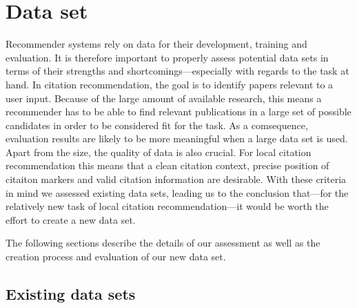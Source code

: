 \chapter{Data set}\label{chap:dataset}
Recommender systems rely on data for their development, training and evaluation. It is therefore important to properly assess potential data sets in terms of their strengths and shortcomings---especially with regards to the task at hand. In citation recommendation, the goal is to identify papers relevant to a user input. Because of the large amount of available research, this means a recommender has to be able to find relevant publications in a large set of possible candidates in order to be considered fit for the task. As a comsequence, evaluation results are likely to be more meaningful when a large data set is used. Apart from the size, the quality of data is also crucial. For local citation recommendation this means that a clean citation context, precise position of citaiton markers and valid citation information are desirable. With these criteria in mind we assessed existing data sets, leading us to the conclusion that---for the relatively new task of local citation recommendation---it would be worth the effort to create a new data set.

The following sections describe the details of our assessment as well as the creation process and evaluation of our new data set.

\section{Existing data sets}


